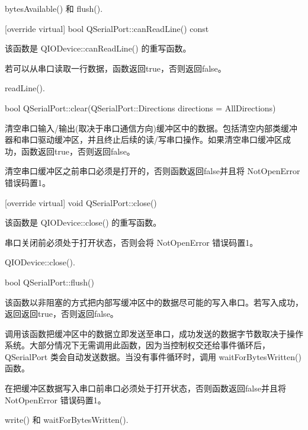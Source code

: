 \begin{seeAlso}
bytesAvailable() 和 flush().
\end{seeAlso}

[override virtual] bool QSerialPort::canReadLine() const

该函数是 QIODevice::canReadLine() 的重写函数。

若可以从串口读取一行数据，函数返回true，否则返回false。

\begin{seeAlso}
readLine().
\end{seeAlso}

bool QSerialPort::clear(QSerialPort::Directions directions = AllDirections)

清空串口输入/输出(取决于串口通信方向)缓冲区中的数据。包括清空内部类缓冲器和串口驱动缓冲区，并且终止后续的读/写串口操作。如果清空串口缓冲区成功，函数返回true，否则返回false。

\begin{notice}
清空串口缓冲区之前串口必须是打开的，否则函数返回false并且将 NotOpenError 错误码置1。
\end{notice}

[override virtual] void QSerialPort::close()

该函数是 QIODevice::close() 的重写函数。

\begin{notice}
串口关闭前必须处于打开状态，否则会将 NotOpenError 错误码置1。
\end{notice}

\begin{seeAlso}
QIODevice::close().
\end{seeAlso}

bool QSerialPort::flush()

该函数以非阻塞的方式把内部写缓冲区中的数据尽可能的写入串口。若写入成功，返回返回true，否则返回false。

调用该函数把缓冲区中的数据立即发送至串口，成功发送的数据字节数取决于操作系统。大部分情况下无需调用此函数，因为当控制权交还给事件循环后，QSerialPort 类会自动发送数据。当没有事件循环时，调用 waitForBytesWritten() 函数。

\begin{notice}
在把缓冲区数据写入串口前串口必须处于打开状态，否则函数返回false并且将 NotOpenError 错误码置1。
\end{notice}

\begin{seeAlso}
write() 和 waitForBytesWritten().
\end{seeAlso}

